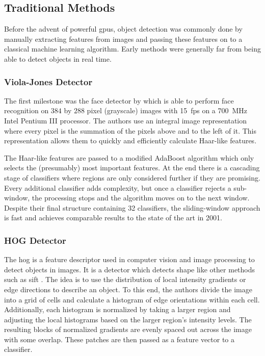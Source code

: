 \documentclass[final]{vutinfth} %
\begin{document}
\subsection{Traditional Methods}
\label{ssec:obj-traditional}

Before the advent of powerful \glspl{gpu}, object detection was
commonly done by manually extracting features from images and passing
these features on to a classical machine learning algorithm. Early
methods were generally far from being able to detect objects in real
time.

\subsubsection{Viola-Jones Detector}
\label{sssec:obj-viola-jones}

The first milestone was the face detector by
\textcite{viola2001,viola2001} which is able to perform face
recognition on $384$ by $288$ pixel (grayscale) images with
\qty{15}{fps} on a \qty{700}{\MHz} Intel Pentium III processor. The
authors use an integral image representation where every pixel is the
summation of the pixels above and to the left of it. This
representation allows them to quickly and efficiently calculate
Haar-like features.

The Haar-like features are passed to a modified AdaBoost
algorithm \cite{freund1995} which only selects the (presumably) most
important features. At the end there is a cascading stage of
classifiers where regions are only considered further if they are
promising. Every additional classifier adds complexity, but once a
classifier rejects a sub-window, the processing stops and the
algorithm moves on to the next window. Despite their final structure
containing 32 classifiers, the sliding-window approach is fast and
achieves comparable results to the state of the art in 2001.

\subsubsection{HOG Detector}
\label{sssec:obj-hog}

The \gls{hog} \cite{dalal2005} is a feature descriptor used in
computer vision and image processing to detect objects in images. It
is a detector which detects shape like other methods such as
\gls{sift} \cite{lowe1999}. The idea is to use the distribution of
local intensity gradients or edge directions to describe an object. To
this end, the authors divide the image into a grid of cells and
calculate a histogram of edge orientations within each
cell. Additionally, each histogram is normalized by taking a larger
region and adjusting the local histograms based on the larger region's
intensity levels. The resulting blocks of normalized gradients are
evenly spaced out across the image with some overlap. These patches
are then passed as a feature vector to a classifier.
\end{document}
